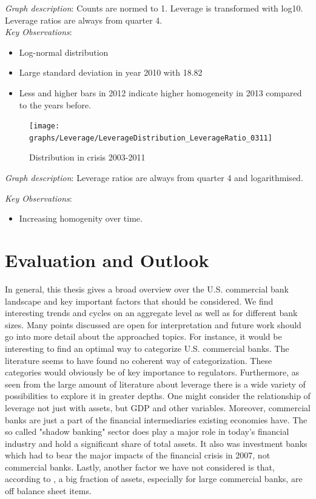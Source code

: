 \documentclass[12pt, a4paper]{article} %
\begin{document}
\noindent \textit{Graph description}: Counts are normed to 1. Leverage is transformed with log10. Leverage ratios are always from quarter 4.
\\

\noindent \textit{Key Observations}:
\begin{itemize}
\item Log-normal distribution
\item Large standard deviation in year 2010 with 18.82
\item Less and higher bars in 2012 indicate higher homogeneity in 2013 compared to the years before.
\end{itemize}

\pagebreak


\begin{figure}[hbtp]
\centering
\caption{Distribution in crisis 2003-2011}
\texttt{[image: graphs/Leverage/LeverageDistribution\_LeverageRatio\_0311]}
\end{figure}

\noindent \textit{Graph description}: Leverage ratios are always from quarter 4 and  logarithmised.

\noindent \textit{Key Observations}:
\begin{itemize}
\item Increasing homogenity over time.
\end{itemize}

\fi

\newpage
\section{Evaluation and Outlook}

In general, this thesis gives a broad overview over the U.S. commercial bank landscape and key important factors that should be considered. We find interesting trends and cycles on an aggregate level as well as for different bank sizes. Many points discussed are open for interpretation and future work should go into more detail about the approached topics. For instance, it would be interesting to find an optimal way to categorize U.S. commercial banks. The literature seems to have found no coherent way of categorization. These categories would obviously be of key importance to regulators. Furthermore, as seen from the large amount of literature about leverage there is a wide variety of possibilities to explore it in greater depths. One might consider the relationship of leverage not just with assets, but GDP and other variables. Moreover, commercial banks are just a part of the financial intermediaries existing economies have. The so called "shadow banking" sector does play a major role in today's financial industry and hold a significant share of total assets. It also was investment banks which had to bear the major impacts of the financial crisis in 2007, not commercial banks. Lastly, another factor we have not considered is that, according to \citet{Kalemli-OzcanBentSorensenSevcanYesiltas2011}, a big fraction of assets, especially for large commercial banks, are off balance sheet items. 
\end{document}
